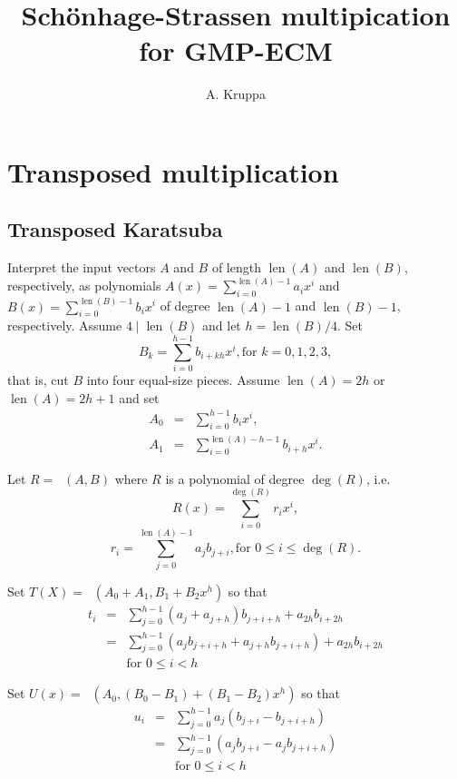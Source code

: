 \documentclass{article}
\DeclareMathOperator{\len}{len}
\DeclareMathOperator{\mult}{mul^{T}}
\begin{document}
\title{Sch\"onhage-Strassen multipication for GMP-ECM}
\author{A. Kruppa}
\maketitle

\section{Transposed multiplication}
\subsection{Transposed Karatsuba}
Interpret the input vectors $A$ and $B$ of length $\len(A)$ and $\len(B)$, 
respectively, as polynomials $A(x) = \sum_{i=0}^{\len(A)-1} a_i x^i$ and
$B(x) = \sum_{i=0}^{\len(B)-1} b_i x^i$ of degree $\len(A)-1$ and $\len(B)-1$, 
respectively. Assume $4\mid \len(B)$ and let $h = \len(B)/4$. 
Set 
\begin{displaymath}
B_k = \sum_{i=0}^{h-1} b_{i+kh} x^i, \textrm{for } k = 0, 1, 2, 3, 
\end{displaymath}
that is, cut $B$ into four equal-size pieces. 
Assume $\len(A) = 2h$ or $\len(A) = 2h+1$ and set
\begin{eqnarray*}
A_0 & = & \sum_{i=0}^{h-1} b_{i} x^i, \\
A_1 & = & \sum_{i=0}^{\len(A)-h-1} b_{i+h} x^i.
\end{eqnarray*}

Let $R = \mult(A, B)$ where $R$ is a polynomial of degree $\deg(R)$, i.e.
%
\begin{displaymath}
R(x) = \sum_{i=0}^{\deg(R)} r_i x^i,
\end{displaymath}
%
\begin{displaymath}
r_i = \sum_{j=0}^{\len(A)-1} a_j b_{j+i}, \textrm{for } 0\leq i \leq \deg(R).
\end{displaymath}

\pagebreak{}

Set $T(X) = \mult(A_0 + A_1, B_1 + B_2 x^h)$
so that
\begin{eqnarray*}
t_i & = & \sum_{j=0}^{h-1} (a_j + a_{j+h}) b_{j+i+h} + a_{2h} b_{i+2h} \\
    & = & \sum_{j=0}^{h-1} (a_j b_{j+i+h} + a_{j+h} b_{j+i+h}) + a_{2h} b_{i+2h} \\
& & \textrm{for } 0\leq i < h
\end{eqnarray*}

Set $U(x) = \mult(A_0, (B_0 - B_1) + (B_1 - B_2) x^h)$
so that
\begin{eqnarray*}
u_i & = & \sum_{j=0}^{h-1} a_j (b_{j+i} - b_{j+i+h}) \\
    & = & \sum_{j=0}^{h-1} (a_j b_{j+i} - a_j b_{j+i+h}) \\
& & \textrm{for } 0\leq i < h
\end{eqnarray*}
\end{document}
